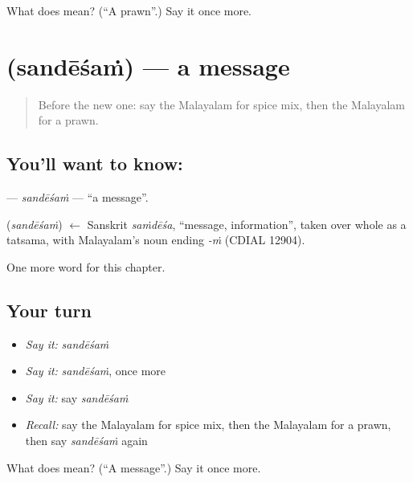 \begin{tcolorbox}[breakable,colback=teal!4,colframe=teal!35!black,title={Before you move on}]
What does  mean? (\textquotedblleft{}A prawn\textquotedblright{}.) Say it once more.
\end{tcolorbox}
\section[\texorpdfstring{\ml{സന്ദേശം} (sandēśaṁ)}{സന്ദേശം (sandēśaṁ)}]{ (sandēśaṁ) — a message}

\label{lesson:ML-C209-sandesam}



\begin{quote}
Before the new one: say the Malayalam for spice mix, then the Malayalam for a prawn.
\end{quote}

\subsection*{You'll want to know: }
\textbf{} — \emph{sandēśaṁ} — \textquotedblleft{}a message\textquotedblright{}.

\begin{cousinweb}
\textbf{} (\emph{sandēśaṁ}) $\leftarrow$ Sanskrit \emph{saṁdēśa}, \textquotedblleft{}message, information\textquotedblright{}, taken over whole as a tatsama, with Malayalam's noun ending \emph{-ṁ} (CDIAL 12904).
\end{cousinweb}

\begin{grammarlens}[title={What you've built}]
One more word for this chapter.
\end{grammarlens}

\subsection*{Your turn}
\begin{itemize}
\raggedright
  \item \emph{Say it:} \emph{sandēśaṁ}
  \item \emph{Say it:} \emph{sandēśaṁ}, once more
  \item \emph{Say it:} say \emph{sandēśaṁ}
  \item \emph{Recall:} say the Malayalam for spice mix, then the Malayalam for a prawn, then say \emph{sandēśaṁ} again
\end{itemize}

\begin{tcolorbox}[breakable,colback=teal!4,colframe=teal!35!black,title={Before you move on}]
What does  mean? (\textquotedblleft{}A message\textquotedblright{}.) Say it once more.
\end{tcolorbox}
